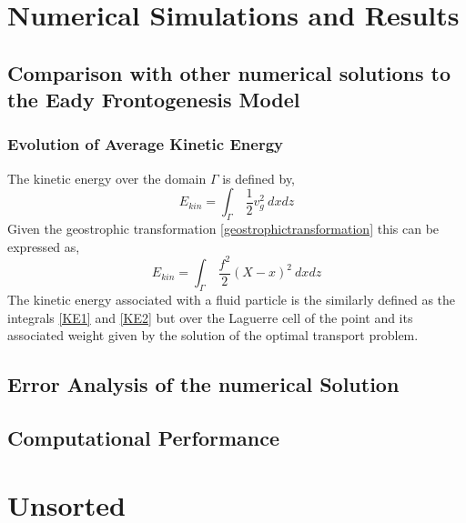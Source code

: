 \chapter{Numerical Simulations and Results \label{results}}
\section{Comparison with other numerical solutions to the Eady Frontogenesis Model}
\subsection{Evolution of Average Kinetic Energy}
The kinetic energy over the domain $\Gamma$ is defined by,
\begin{equation}
	E_{kin} = \int_\Gamma \ \frac{1}{2}v_g^2 \ dxdz
	\label{KE1}
\end{equation}
Given the geostrophic transformation \ref{geostrophictransformation} this can be expressed as,
\begin{equation}
E_{kin} = \int_\Gamma \ \frac{f^2}{2}(X-x)^2 \ dxdz
\label{KE2}
\end{equation}
The kinetic energy associated with a fluid particle is the similarly defined as the integrals \ref{KE1} and \ref{KE2} but over the Laguerre cell of the point and its associated weight given by the solution of the optimal transport problem.
\section{Error Analysis of the numerical Solution}
\section{Computational Performance}
\chapter{Unsorted}
